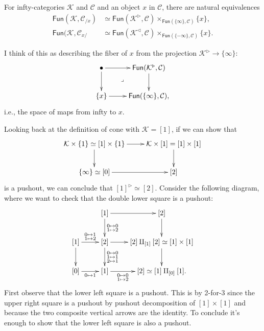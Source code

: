 \begin{lemma}
\label{lemma-pullback-cone}
For infty-categories $\mathcal{K}$ and
$\mathcal{C}$
and an object $x$ in $\mathcal{C}$,
there are natural equivalences
$$
\begin{aligned}
\mathsf{Fun}(\mathcal{K},\mathcal{C}_{/x})&
\simeq
\mathsf{Fun}(\mathcal{K}^{\triangleright},
\mathcal{C})
\times_{\mathsf{Fun}(\{\infty\},\mathcal{C})}
\{x\},\\
\mathsf{Fun}(\mathcal{K},\mathcal{C}_{x/}&
\simeq
\mathsf{Fun}(\mathcal{K}^{\triangleleft},
\mathcal{C})
\times_{\mathsf{Fun}(\{-\infty\},\mathcal{C})
}\{x\}.
\end{aligned}
$$
\end{lemma}

\noindent
I think of this as describing the fiber of
$x$ from the
projection $\mathcal{K}^{\triangleright} \to
\{\infty\}$:
$$
\xymatrix{
\bullet\ar[r]\ar[d]\ar@{}[dr]|-{\lrcorner}
&\mathsf{Fun}(\mathcal{K}^{\triangleright},
\mathcal{C})\ar[d]\\
\{x\}\ar[r]&\mathsf{Fun}(\{\infty\},
\mathcal{C}),
}
$$
i.e., the space of maps from infty to $x$.

\medskip\noindent
Looking back at the definition of cone
with $\mathcal{K}=[1]$,
if we can show that
$$
\xymatrix{
\mathcal{K}\times\{1\}\simeq[1]\times\{1\}
\ar[r]\ar[d]
&\mathcal{K}\times[1]=[1]\times[1]\ar[d]\\
\{\infty\}\simeq[0]\ar[r]&[2]
}
$$
is a pushout, we can conclude that
$[1]^{\triangleright}\simeq[2]$.
Consider the following diagram,
where we want to check that the double lower
square is a pushout:
$$
\xymatrix{
&[1]\ar[r]\ar[d]^{\substack{0\mapsto 0 \\
1\mapsto 2}}
&[2]\ar[d]\\
[1]\ar[d]\ar[r]^{\substack{0 \mapsto 1 \\ 1
\mapsto 2}}
&[2]\ar[r]\ar[d]^{\substack{0\mapsto 0 \\ 1
\mapsto 1\\2\mapsto 1}}
&[2]\amalg_{[1]}[2]\simeq[1]\times[1]\ar[d]\\
[0]\ar[r]_{0 \mapsto
1}&[1]\ar[r]_-{\substack{0 \mapsto 0 \\ 1
\mapsto 2}}&[2]\simeq[1]\amalg_{[0]}[1].
}
$$
First observe that the lower left square is a
pushout.
This is by 2-for-3 since the upper right
square is a pushout
by pushout decomposition of $[1]\times[1]$
and because the two composite vertical arrows
are the identity.
To conclude it's enough to show that the
lower left square
is also a pushout.

